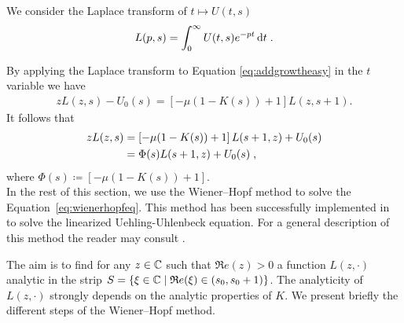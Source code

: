 \documentclass[11pt]{amsart}
\renewcommand{\Re}{\mathfrak{R}e}
\newcommand{\diff}{\,\mathrm{d}}
\begin{document}
We consider the Laplace transform of $t \mapsto U(t,s)$
\begin{align}
    L(p,s) = \int_0^\infty U(t,s)e^{-pt}\diff t
    \eqfinp
\end{align}

By applying the Laplace transform to Equation \eqref{eq:addgrowtheasy} in the $t$ variable we have 
\begin{align*}
    zL(z,s) - U_0(s) = \left[- \mu (1-K(s)) + 1\right] L(z,s+1).
\end{align*}
It follows that 
\begin{equation}
\begin{aligned}
    \label{eq:wienerhopfeq}
    zL(z,s) 
    &= \left[- \mu (1-K(s)) + 1\right] L(s+1,z) + U_0(s) \\
    &= \Phi(s) L(s+1,z) + U_0(s)
    \; ,
\end{aligned} 
\end{equation}
where $\Phi(s) \coloneqq \left[- \mu (1-K(s)) + 1\right]$. \\

In the rest of this section, we use the Wiener--Hopf method to solve the Equation~\eqref{eq:wienerhopfeq}. This method has been successfully implemented in \cite{escobedo2007fundamental} to solve the linearized Uehling-Uhlenbeck equation. For a general description of this method the reader may consult \cite{zakharov2012kolmogorov}. 
\medskip

The aim is to find for any $z \in \mathbb{C}$ such that $\Re(z) > 0$ a function $L(z, \cdot)$ analytic in the strip $S = \{\xi \in \CC \mid \Re(\xi) \in (s_0, s_0+1)\}$. The analyticity of $L(z, \cdot)$ strongly depends on the analytic properties of $K$. We present briefly the different steps of the Wiener--Hopf method. 
\end{document}
